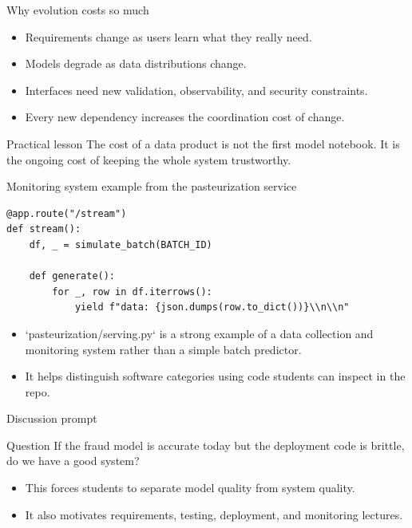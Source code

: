 \begin{frame}{Why evolution costs so much}
\begin{itemize}
\item Requirements change as users learn what they really need.
\item Models degrade as data distributions change.
\item Interfaces need new validation, observability, and security constraints.
\item Every new dependency increases the coordination cost of change.
\end{itemize}
\begin{block}{Practical lesson}
The cost of a data product is not the first model notebook. It is the ongoing cost of keeping the whole system trustworthy.
\end{block}
\coursefooter
\end{frame}

\begin{frame}[fragile]{Monitoring system example from the pasteurization service}
\begin{lstlisting}[style=coursepython]
@app.route("/stream")
def stream():
    df, _ = simulate_batch(BATCH_ID)

    def generate():
        for _, row in df.iterrows():
            yield f"data: {json.dumps(row.to_dict())}\\n\\n"
\end{lstlisting}
\begin{itemize}
\item `pasteurization/serving.py` is a strong example of a data collection and monitoring system rather than a simple batch predictor.
\item It helps distinguish software categories using code students can inspect in the repo.
\end{itemize}
\coursefooter
\end{frame}

\begin{frame}{Discussion prompt}
\begin{block}{Question}
If the fraud model is accurate today but the deployment code is brittle, do we have a good system?
\end{block}
\begin{itemize}
\item This forces students to separate model quality from system quality.
\item It also motivates requirements, testing, deployment, and monitoring lectures.
\end{itemize}
\coursefooter
\end{frame}

